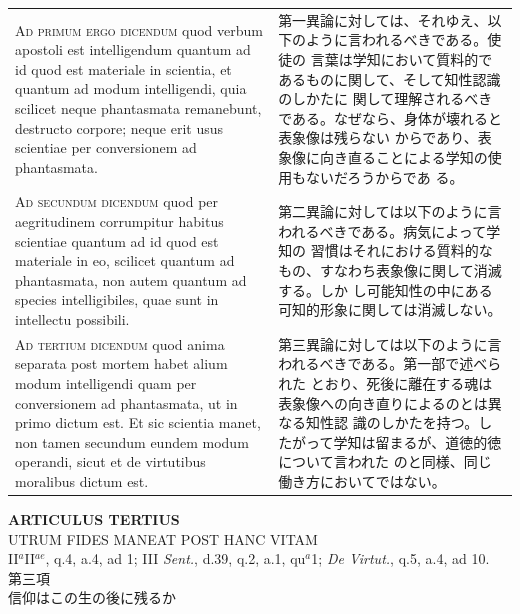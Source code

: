 \documentclass[paper=a4paper,fontsize=10pt,jafontsize=9pt,titlepage]{jlreq}
\begin{document}
\begin{longtable}{p{21em}p{21em}}
\\




 {\scshape Ad primum ergo dicendum} quod verbum apostoli est
 intelligendum quantum ad id quod est materiale in scientia, et
 quantum ad modum intelligendi, quia scilicet neque phantasmata
 remanebunt, destructo corpore; neque erit usus scientiae per
 conversionem ad phantasmata.

 
&

 第一異論に対しては、それゆえ、以下のように言われるべきである。使徒の
 言葉は学知において質料的であるものに関して、そして知性認識のしかたに
 関して理解されるべきである。なぜなら、身体が壊れると表象像は残らない
 からであり、表象像に向き直ることによる学知の使用もないだろうからであ
 る。

\\




 {\scshape Ad secundum dicendum} quod per aegritudinem corrumpitur
 habitus scientiae quantum ad id quod est materiale in eo, scilicet
 quantum ad phantasmata, non autem quantum ad species intelligibiles,
 quae sunt in intellectu possibili.
 
&

 第二異論に対しては以下のように言われるべきである。病気によって学知の
 習慣はそれにおける質料的なもの、すなわち表象像に関して消滅する。しか
 し可能知性の中にある可知的形象に関しては消滅しない。

\\


 {\scshape Ad tertium dicendum} quod anima separata post mortem habet
 alium modum intelligendi quam per conversionem ad phantasmata, ut in
 primo dictum est. Et sic scientia manet, non tamen secundum eundem
 modum operandi, sicut et de virtutibus moralibus dictum est.

 
&

 第三異論に対しては以下のように言われるべきである。第一部で述べられた
 とおり、死後に離在する魂は表象像への向き直りによるのとは異なる知性認
 識のしかたを持つ。したがって学知は留まるが、道徳的徳について言われた
 のと同様、同じ働き方においてではない。
 
\\


\end{longtable}
\newpage



\begin{center}
{\Large {\bfseries ARTICULUS TERTIUS}}\\
{\large UTRUM FIDES MANEAT POST HANC VITAM}\\
{\footnotesize II$^{a}$II$^{ae}$, q.4, a.4, ad 1; III {\itshape Sent.}, d.39, q.2, a.1, qu$^{a}$1; {\itshape De Virtut.}, q.5, a.4, ad 10.}\\
{\Large 第三項\\信仰はこの生の後に残るか}
\end{center}
\end{document}
